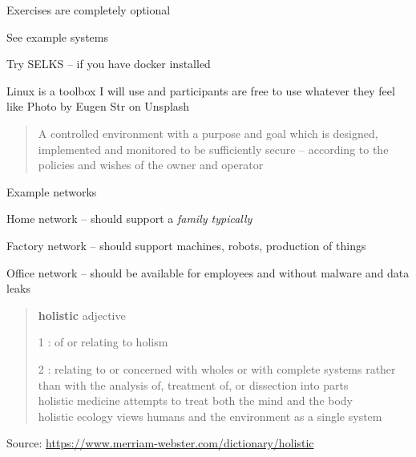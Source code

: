 \documentclass[Screen16to9,17pt]{foils}
\begin{document}
Exercises are completely optional

\begin{list2}
\item See example systems
\item Try SELKS -- if you have docker installed
\item
\end{list2}

Linux is a toolbox I will use and participants are free to use whatever they feel like
\hfill Photo by Eugen Str on Unsplash






\begin{quote}
A controlled environment with a purpose and goal which is designed, implemented and monitored to be sufficiently secure -- according to the policies and wishes of the owner and operator
\end{quote}

Example networks
\begin{list2}
\item Home network -- should support a \emph{family typically}
\item Factory network -- should support machines, robots, production of things
\item Office network -- should be available for employees and without malware and data leaks
\end{list2}


\begin{quote}
{\bf\Large holistic} adjective

\begin{list2}
\item[1]: of or relating to holism
\item[2] : relating to or concerned with wholes or with complete systems rather than with the analysis of, treatment of, or dissection into parts\\
holistic medicine attempts to treat both the mind and the body\\
holistic ecology views humans and the environment as a single system
\end{list2}
\end{quote}
Source: \url{https://www.merriam-webster.com/dictionary/holistic}
\end{document}

